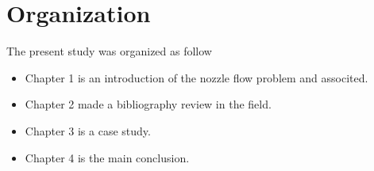 \section{Organization}

The present study was organized as follow 

\begin{itemize}
\item Chapter 1 is an introduction of the nozzle flow problem and associted.
\item Chapter 2 made a bibliography review in the field.
\item Chapter 3 is a case study.
\item Chapter 4 is the main conclusion.
\end{itemize}


